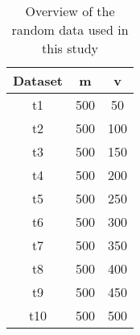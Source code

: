 \begin{table}
	\begin{center}
		\begin{tabular}{c|c|c}
			Dataset & m & v \\
			\hline
			t1 & 500 & 50 \\
			t2 & 500 & 100 \\
			t3 & 500 & 150 \\
			t4 & 500 & 200 \\
			t5 & 500 & 250 \\
			t6 & 500 & 300 \\
			t7 & 500 & 350 \\
			t8 & 500 & 400 \\
			t9 & 500 & 450 \\
			t10 & 500 & 500 \\
		\end{tabular}
	\end{center}
	\caption{Overview of the random data used in this study}
\end{table}